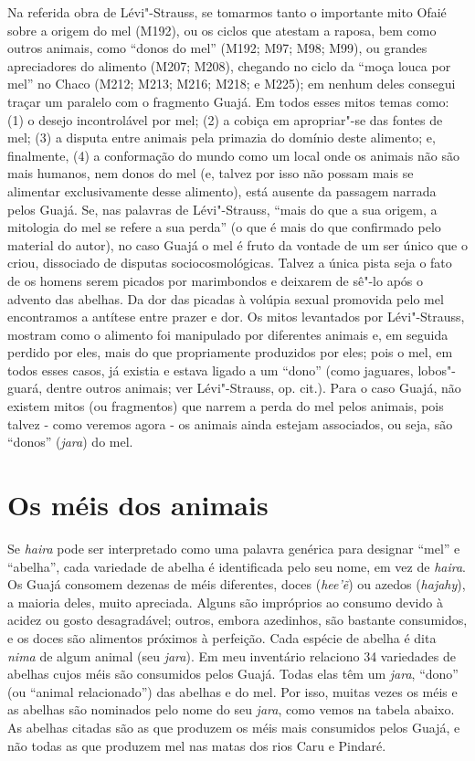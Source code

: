 Na referida obra de Lévi"-Strauss, se tomarmos tanto o importante mito
Ofaié sobre a origem do mel (M192), ou os ciclos que atestam a raposa,
bem como outros animais, como ``donos do mel'' (M192; M97; M98; M99), ou
grandes apreciadores do alimento (M207; M208), chegando no ciclo da
``moça louca por mel'' no Chaco (M212; M213; M216; M218; e M225); em
nenhum deles consegui traçar um paralelo com o fragmento Guajá. Em todos
esses mitos temas como: (1) o desejo incontrolável por mel; (2) a cobiça
em apropriar"-se das fontes de mel; (3) a disputa entre animais pela
primazia do domínio deste alimento; e, finalmente, (4) a conformação do
mundo como um local onde os animais não são mais humanos, nem donos do
mel (e, talvez por isso não possam mais se alimentar exclusivamente
desse alimento), está ausente da passagem narrada pelos Guajá. Se, nas
palavras de Lévi"-Strauss, ``mais do que a sua origem, a mitologia do mel
se refere a sua perda'' (o que é mais do que confirmado pelo material do
autor), no caso Guajá o mel é fruto da vontade de um ser único que o
criou, dissociado de disputas sociocosmológicas. Talvez a única pista
seja o fato de os homens serem picados por marimbondos e deixarem de
sê"-lo após o advento das abelhas. Da dor das picadas à volúpia sexual
promovida pelo mel encontramos a antítese entre prazer e dor. Os mitos
levantados por Lévi"-Strauss, mostram como o alimento foi manipulado por
diferentes animais e, em seguida perdido por eles, mais do que
propriamente produzidos por eles; pois o mel, em todos esses casos, já
existia e estava ligado a um ``dono'' (como jaguares, lobos"-guará, dentre
outros animais; ver Lévi"-Strauss, op. cit.). Para o caso Guajá, não
existem mitos (ou fragmentos) que narrem a perda do mel pelos animais,
pois talvez - como veremos agora - os animais ainda estejam associados,
ou seja, são ``donos'' (\emph{jara}) do mel.

\section{Os méis dos animais}

Se \emph{haira} pode ser interpretado como uma palavra genérica para
designar ``mel'' e ``abelha'', cada variedade de abelha é identificada
pelo seu nome, em vez de \emph{haira}. Os Guajá consomem dezenas de méis
diferentes, doces (\emph{hee'ẽ}) ou azedos (\emph{hajahy}), a maioria
deles, muito apreciada. Alguns são impróprios ao consumo devido à acidez
ou gosto desagradável; outros, embora azedinhos, são bastante
consumidos, e os doces são alimentos próximos à perfeição. Cada espécie
de abelha é dita \emph{nima} de algum animal (seu \emph{jara}). Em meu
inventário relaciono 34 variedades de abelhas cujos méis são consumidos
pelos Guajá. Todas elas têm um \emph{jara}, ``dono'' (ou ``animal
relacionado'') das abelhas e do mel. Por isso, muitas vezes os méis e as
abelhas são nominados pelo nome do seu \emph{jara}, como vemos na tabela
abaixo. As abelhas citadas são as que produzem os méis mais consumidos
pelos Guajá, e não todas as que produzem mel nas matas dos rios Caru e
Pindaré.

